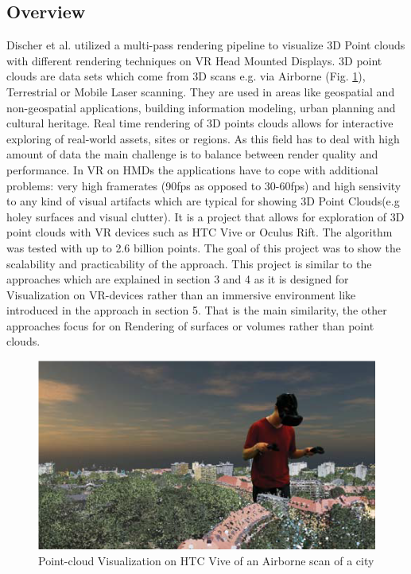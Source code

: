\documentclass[10pt,twocolumn,letterpaper]{article}
\begin{document}
\subsection{Overview}
Discher et al. \cite{discher_point-based_2018} utilized a multi-pass rendering pipeline to visualize 3D Point clouds with different rendering techniques on VR Head Mounted Displays. 3D point clouds are data sets which come from 3D scans e.g. via Airborne (Fig. \ref{fig:pointcloud_1}), Terrestrial or Mobile Laser scanning. They are used in areas like geospatial and non-geospatial applications, building information modeling, urban planning and cultural heritage. Real time rendering of 3D points clouds allows for interactive exploring of real-world assets, sites or regions. As this field has to deal with high amount of data the main challenge is to balance between render quality and performance. In VR on HMDs the applications have to cope with additional problems: very high framerates (90fps as opposed to 30-60fps) and high sensivity to any kind of visual artifacts which are typical for showing 3D Point Clouds(e.g holey surfaces and visual clutter). It is a project that allows for exploration of 3D point clouds with VR devices such as HTC Vive or Oculus Rift. The algorithm was tested with up to 2.6 billion points. The goal of this project was to show the scalability and practicability of the approach. This project is similar to the approaches which are explained in section 3 and 4 as it is designed for Visualization on VR-devices rather than an immersive environment like introduced in the approach in section 5. That is the main similarity, the other approaches focus for on Rendering of surfaces or volumes rather than point clouds.
\begin{figure}
	\includegraphics{pointcloud_1.png}
	\caption{Point-cloud Visualization on HTC Vive of an Airborne scan of a city}
	\label{fig:pointcloud_1}
\end{figure}
\end{document}
